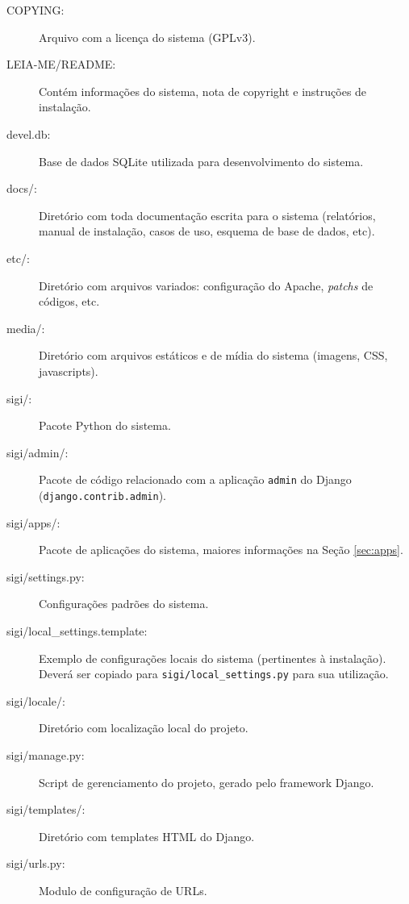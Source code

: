 \begin{description}
\item[COPYING:] Arquivo com a licença do sistema (GPLv3).

\item[LEIA-ME/README:] Contém informações do sistema, nota de
  copyright e instruções de instalação.

\item[devel.db:] Base de dados SQLite utilizada para desenvolvimento
  do sistema.

\item[docs/:] Diretório com toda documentação escrita para o sistema
  (relatórios, manual de instalação, casos de uso, esquema de base de
  dados, etc).

\item[etc/:] Diretório com arquivos variados: configuração do Apache,
  \textit{patchs} de códigos, etc.

\item[media/:] Diretório com arquivos estáticos e de mídia do sistema
  (imagens, CSS, javascripts).

\item[sigi/:] Pacote Python do sistema.

\item[sigi/admin/:] Pacote de código relacionado com a aplicação
  \verb|admin| do Django (\verb|django.contrib.admin|).

\item[sigi/apps/:] Pacote de aplicações do sistema, maiores
  informações na Seção \ref{sec:apps}.

\item[sigi/settings.py:] Configurações padrões do sistema.

\item[sigi/local\_settings.template:] Exemplo de configurações locais
  do sistema (pertinentes à instalação). Deverá ser copiado para
  \verb|sigi/local_settings.py| para sua utilização.

\item[sigi/locale/:] Diretório com localização local do projeto.

\item[sigi/manage.py:] Script de gerenciamento do projeto, gerado pelo
  framework Django.

\item[sigi/templates/:] Diretório com templates HTML do Django.

\item[sigi/urls.py:] Modulo de configuração de URLs.
\end{description}


